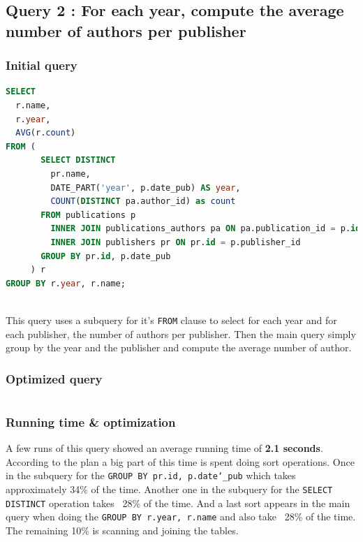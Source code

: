 \documentclass[doubleside, titlepage]{article}
\begin{document}
\subsection{Query 2 : For each year, compute the average number of authors per publisher}

\subsubsection{Initial query}
		\begin{lstlisting}[language=SQL,showspaces=false,basicstyle=\ttfamily,numberstyle=\tiny,commentstyle=\color{gray}]
SELECT
  r.name,
  r.year,
  AVG(r.count)
FROM (
       SELECT DISTINCT
         pr.name,
         DATE_PART('year', p.date_pub) AS year,
         COUNT(DISTINCT pa.author_id) as count
       FROM publications p
         INNER JOIN publications_authors pa ON pa.publication_id = p.id
         INNER JOIN publishers pr ON pr.id = p.publisher_id
       GROUP BY pr.id, p.date_pub
     ) r
GROUP BY r.year, r.name;
		\end{lstlisting}
~\\
This query uses a subquery for it's \texttt{FROM} clause to select for each year and for each publisher, the number of authors per publisher. Then the main query simply group by the year and the publisher and compute the average number of author.~\\

\subsubsection{Optimized query}
		\begin{lstlisting}[language=SQL,showspaces=false,basicstyle=\ttfamily,numberstyle=\tiny,commentstyle=\color{gray}]

		\end{lstlisting}

\subsubsection{Running time \& optimization}

A few runs of this query showed an average running time of \textbf{2.1 seconds}. According to the plan a big part of this time is spent doing sort operations. Once in the subquery for the \texttt{GROUP BY pr.id, p.date\char`_pub} which takes approximately 34\% of the time. Another one in the subquery for the \texttt{SELECT DISTINCT} operation takes ~28\% of the time. And a last sort appears in the main query when doing the \texttt{GROUP BY r.year, r.name} and also take ~28\% of the time. The remaining 10\% is scanning and joining the tables.
\end{document}
